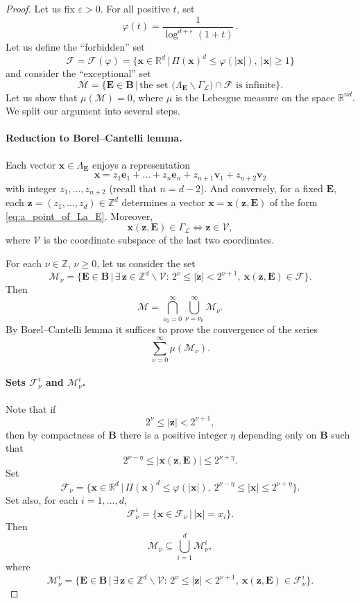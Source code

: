 \documentclass[10pt,a4paper]{amsart}
\newcommand{\Ga}{\Gamma}
\newcommand{\La}{\Lambda}
\newcommand{\R}{\mathbb{R}}
\newcommand{\Z}{\mathbb{Z}}
\newcommand{\bB}{\mathbf{B}}
\newcommand{\bE}{\mathbf{E}}
\newcommand{\cF}{\mathcal{F}}
\newcommand{\cL}{\mathcal{L}}
\newcommand{\cM}{\mathcal{M}}
\newcommand{\cV}{\mathcal{V}}
\newcommand{\e}{\varepsilon}
\renewcommand{\geq}{\geqslant}
\renewcommand{\leq}{\leqslant}
\renewcommand{\vec}[1]{\mathbf{#1}}
\begin{document}
\begin{proof}
  Let us fix $\e>0$. For all positive $t$, set
  \[
    \varphi(t)=\frac1{\log^{d+\e}(1+t)}\,.
  \]
  Let us define the ``forbidden'' set
  \[
    \cF=\cF(\varphi)=\Big\{\vec x\in\R^d \,\Big|\, \Pi(\vec x)^d\leq\varphi(|\vec x|),\ |\vec x|\geq1 \Big\}
  \]
  and consider the ``exceptional'' set
  \[
    \cM=\Big\{\bE\in\bB \,\Big|\, \text{the set }\big(\La_\bE\backslash\Ga_\cL\big)\cap\cF\text{ is infinite} \Big\}.
  \]
  Let us show that $\mu(\cM)=0$, where $\mu$ is the Lebesgue measure on the space $\R^{nd}$. We split our argument into several steps.
  
  \paragraph{Reduction to Borel--Cantelli lemma.}
  
  Each vector $\vec x\in\La_\bE$ enjoys a representation
  \begin{equation}\label{eq:a_point_of_La_E}
    \vec x=z_1\vec e_1+\ldots+z_n\vec e_n+z_{n+1}\vec v_1+z_{n+2}\vec v_2
  \end{equation}
  with integer $z_1,\ldots,z_{n+2}$ (recall that $n=d-2$). And conversely, for a fixed $\bE$, each $\vec z=(z_1,\ldots,z_d)\in\Z^d$ determines a vector $\vec x=\vec x(\vec z,\bE)$ of the form \eqref{eq:a_point_of_La_E}. Moreover,
  \[
    \vec x(\vec z,\bE)\in\Ga_\cL
    \iff
    \vec z\in\cV,
  \]
  where $\cV$ is the coordinate subspace of the last two coordinates.

  For each $\nu\in\Z$, $\nu\geq0$, let us consider the set
  \[
    \cM_\nu=\Big\{\bE\in\bB \,\Big|\, \exists\,\vec z\in\Z^d\backslash\cV:\,2^\nu\leq|\vec z|<2^{\nu+1},\ \vec x(\vec z,\bE)\in\cF \Big\}.
  \]
  Then
  \[
    \cM=\bigcap_{\nu_0=0}^\infty\bigcup_{\nu=\nu_0}^\infty\cM_\nu.
  \]
  By Borel--Cantelli lemma it suffices to prove the convergence of the series
  \begin{equation}\label{eq:borel_cantelli_series}
    \sum_{\nu=0}^\infty\mu(\cM_\nu).
  \end{equation}
  
  \paragraph{Sets $\cF^i_\nu$ and $\cM^i_\nu$.}  
  
  Note that if
  \[
    2^\nu\leq|\vec z|<2^{\nu+1},
  \]
  then by compactness of $\bB$ there is a positive integer $\eta$ depending only on $\bB$ such that
  \[
    2^{\nu-\eta}\leq|\vec x(\vec z,\bE)|\leq2^{\nu+\eta}.
  \]
  Set
  \[
    \cF_\nu=\Big\{\vec x\in\R^d \,\Big|\, \Pi(\vec x)^d\leq\varphi(|\vec x|),\ 2^{\nu-\eta}\leq|\vec x|\leq2^{\nu+\eta} \Big\}.
  \]
  Set also, for each $i=1,\ldots,d$,
  \[
    \cF^i_\nu=\Big\{\vec x\in\cF_\nu \,\Big|\, |\vec x|=x_i \Big\}.
  \]
  Then
  \[
    \cM_\nu\subseteq\bigcup_{i=1}^d\cM^i_\nu,
  \]
  where
  \[
    \cM^i_\nu=\Big\{\bE\in\bB \,\Big|\, \exists\,\vec z\in\Z^d\backslash\cV:\,2^\nu\leq|\vec z|<2^{\nu+1},\ \vec x(\vec z,\bE)\in\cF^i_\nu \Big\}.
  \]
  

\end{proof}
\end{document}
